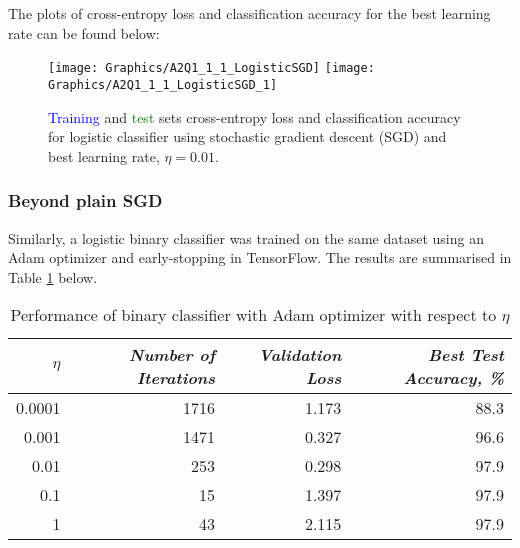 \documentclass[a4paper,12pt]{article}
\begin{document}
The plots of cross-entropy loss and classification accuracy for the best learning rate can be found below:

\begin{figure}[!htb]
\centering
\texttt{[image: Graphics/A2Q1\_1\_1\_LogisticSGD]}
\texttt{[image: Graphics/A2Q1\_1\_1\_LogisticSGD\_1]}
\caption{\label{figure:LogisticSGD} \textcolor{blue}{Training} and \textcolor{green}{test} sets cross-entropy loss and classification accuracy for logistic classifier using stochastic gradient descent (SGD) and best learning rate, $\eta = 0.01$.}
\end{figure}

\clearpage
\subsubsection{Beyond plain SGD}

Similarly, a logistic binary classifier was trained on the same dataset using an Adam optimizer and early-stopping in TensorFlow. The results are summarised in Table \ref{table:TuneLearningRateAdam} below.

\begin{table}[!htb]
\centering
\caption{Performance of binary classifier with Adam optimizer with respect to $\eta$}
\label{table:TuneLearningRateAdam}
\vspace{0.5em}
\begin{tabular}{|r|r r r|} \hline
$\eta$ & \textit{Number of Iterations} & \textit{Validation Loss} & \textit{Best Test Accuracy, \%} \\ \hline
0.0001 & 1716 & 1.173 & 88.3 \\
0.001 & 1471 & 0.327 & 96.6 \\
0.01 & 253 & 0.298 & 97.9 \\
0.1 & 15 & 1.397 & 97.9 \\
1 & 43 & 2.115 & 97.9 \\
\hline
\end{tabular}
\end{table}

\end{document}
